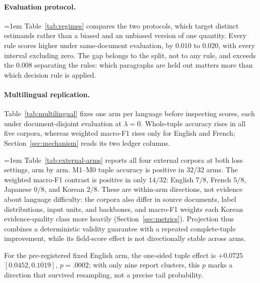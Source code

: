 \paragraph{Evaluation protocol.}
\begingroup\emergencystretch=1em
Table~\ref{tab:regimes} compares the two protocols, which target distinct
estimands rather than a biased and an unbiased version of one quantity. Every
rule scores higher under same-document evaluation, by $0.010$ to $0.020$, with
every interval excluding zero. The gap belongs to the split, not to any rule,
and exceeds the $0.008$ separating the rules: which paragraphs are held out
matters more than which decision rule is applied.
\par\endgroup

\paragraph{Multilingual replication.}
Table~\ref{tab:multilingual} fixes one arm per language before inspecting
scores, each under document-disjoint evaluation at $\lambda=0$. Whole-tuple
accuracy rises in all five corpora, whereas weighted macro-F1 rises only for
English and French; Section~\ref{sec:mechanism} reads its two ledger columns.

\begingroup\emergencystretch=1em
Table~\ref{tab:external-arms} reports all four external corpora at both loss
settings, arm by arm. M1--M0 tuple accuracy is positive in $32/32$ arms. The
weighted
macro-F1 contrast is positive in only $14/32$: English $7/8$, French $5/8$,
Japanese $0/8$, and Korean $2/8$. These are within-arm directions, not
evidence about language difficulty: the corpora also differ in source
documents, label distributions, input units, and backbones, and macro-F1
weights each Korean evidence-quality class more heavily
(Section~\ref{sec:metrics}). Projection thus combines a deterministic
validity guarantee with a repeated complete-tuple improvement, while its
field-score effect is not directionally stable across arms.
\par\endgroup

\begin{sloppypar}
For the pre-registered fixed English arm, the one-sided tuple effect is
$+0.0725$ $[0.0452,0.1019]$, $p=.0002$; with only nine report clusters, this
$p$ marks a direction that survived resampling, not a precise tail
probability.
\end{sloppypar}

\begin{table}[t]
  \centering
  \small
  \caption{\protect}
  \label{tab:external-arms}
  \begingroup
  \small
  \setlength{\tabcolsep}{4pt}
  
  \endgroup
\end{table}

